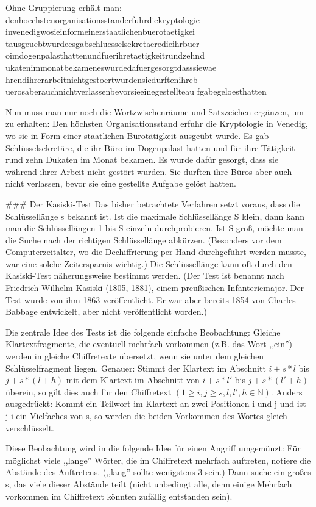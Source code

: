 \documentclass[a4paper]{article}
\begin{document}
\begin{multicols}{3}
Ohne Gruppierung erhält man:
denhoechstenorganisationsstanderfuhrdiekryptologie
invenedigwosieinformeinerstaatlichenbuerotaetigkei
tausgeuebtwurdeesgabschluesselsekretaeredieihrbuer
oimdogenpalasthattenundfuerihretaetigkeitrundzehnd
ukatenimmonatbekameneswurdedafuergesorgtdasssiewae
hrendihrerarbeitnichtgestoertwurdensiedurftenihreb
uerosaberauchnichtverlassenbevorsieeinegestellteau
fgabegeloesthatten

Nun muss man nur noch die Wortzwischenräume und Satzzeichen ergänzen, um zu erhalten:
Den höchsten Organisationsstand erfuhr die Kryptologie in Venedig, wo sie in Form einer staatlichen Bürotätigkeit ausgeübt wurde. Es gab Schlüsselsekretäre, die ihr Büro im Dogenpalast hatten und für ihre Tätigkeit rund zehn Dukaten im Monat bekamen. Es wurde dafür gesorgt, dass sie während ihrer Arbeit nicht gestört wurden. Sie durften ihre Büros aber auch nicht verlassen, bevor sie eine gestellte Aufgabe gelöst hatten.

### Der Kasiski-Test
Das bisher betrachtete Verfahren setzt voraus, dass die Schlüssellänge s bekannt ist. Ist die maximale Schlüssellänge S klein, dann kann man die Schlüssellängen 1 bis S einzeln durchprobieren. Ist S groß, möchte man die Suche nach der richtigen Schlüssellänge abkürzen. (Besonders vor dem Computerzeitalter, wo die Dechiffrierung per Hand durchgeführt werden musste, war eine solche Zeitersparnis wichtig.) Die Schlüssellänge kann oft durch den Kasiski-Test näherungsweise bestimmt werden. (Der Test ist benannt nach Friedrich Wilhelm Kasiski (1805, 1881), einem preußischen Infanteriemajor. Der Test wurde von ihm 1863 veröffentlicht. Er war aber bereits 1854 von Charles Babbage entwickelt, aber nicht veröffentlicht worden.)

Die zentrale Idee des Tests ist die folgende einfache Beobachtung: Gleiche Klartextfragmente, die eventuell mehrfach vorkommen (z.B. das Wort ,,ein'') werden in gleiche Chiffretexte übersetzt, wenn sie unter dem gleichen Schlüsselfragment liegen. Genauer: Stimmt der Klartext im Abschnitt $i+s*l$ bis $j+s*(l+h)$ mit dem Klartext im Abschnitt von $i+s*l′$ bis $j+s*(l′+h)$ überein, so gilt dies auch für den Chiffretext $(1\geq i,j\geq s,l,l′,h\in\mathbb{N})$. 
Anders ausgedrückt: Kommt ein Teilwort im Klartext an zwei Positionen i und j und ist j-i ein Vielfaches von s, so werden die beiden Vorkommen des Wortes gleich verschlüsselt.

Diese Beobachtung wird in die folgende Idee für einen Angriff umgemünzt: Für möglichst viele ,,lange'' Wörter, die im Chiffretext mehrfach auftreten, notiere die Abstände des Auftretens. (,,lang'' sollte wenigstens 3 sein.) Dann suche ein großes s, das viele dieser Abstände teilt (nicht unbedingt alle, denn einige Mehrfach vorkommen im Chiffretext könnten zufällig entstanden sein).


\end{multicols}
\end{document}
